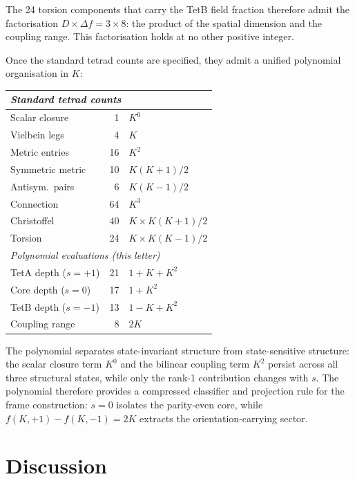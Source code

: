 \documentclass[twocolumn]{iopjournal}
\begin{document}
The 24 torsion components that carry the TetB field fraction
therefore admit the factorisation $D \times \Delta f = 3 \times
8$: the product of the spatial dimension and the coupling range.
This factorisation holds at no other positive integer.

Once the standard tetrad counts are specified, they admit a
unified polynomial organisation in $K$:

\medskip
\begin{center}
\begin{tabular}{lrl}
\hline
\multicolumn{3}{l}{\textit{Standard tetrad counts}} \\
\hline
Scalar closure    & 1  & $K^0$ \\
Vielbein legs     & 4  & $K$ \\
Metric entries    & 16 & $K^2$ \\
Symmetric metric  & 10 & $K(K{+}1)/2$ \\
Antisym.\ pairs   & 6  & $K(K{-}1)/2$ \\
Connection        & 64 & $K^3$ \\
Christoffel       & 40 & $K \!\times\! K(K{+}1)/2$ \\
Torsion           & 24 & $K \!\times\! K(K{-}1)/2$ \\
\hline
\multicolumn{3}{l}{\textit{Polynomial evaluations (this letter)}} \\
\hline
TetA depth ($s{=}{+}1$) & 21 & $1 + K + K^2$ \\
Core depth ($s{=}0$)     & 17 & $1 + K^2$ \\
TetB depth ($s{=}{-}1$)  & 13 & $1 - K + K^2$ \\
Coupling range           & 8  & $2K$ \\
\hline
\end{tabular}
\end{center}
\medskip

\noindent
The polynomial separates state-invariant structure from
state-sensitive structure: the scalar closure term $K^0$ and the
bilinear coupling term $K^2$ persist across all three structural
states, while only the rank-1 contribution changes with $s$. The
polynomial therefore provides a compressed classifier and
projection rule for the frame construction: $s = 0$ isolates the
parity-even core, while $f(K,{+}1) - f(K,{-}1) = 2K$ extracts
the orientation-carrying sector.


\section{Discussion}
\end{document}
